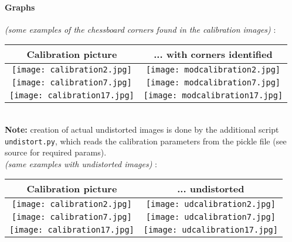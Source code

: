 \documentclass[a4paper]{article}
\begin{document}
\paragraph{Graphs}
\textit{(some examples of the chessboard corners found in the calibration images)}
:\\
\begin{tabular}{ |c|c| }
  \hline
  Calibration picture & ... with corners identified \\
  \hline
  \texttt{[image: calibration2.jpg]} & \texttt{[image: modcalibration2.jpg]} \\
  \hline
  \texttt{[image: calibration7.jpg]} & \texttt{[image: modcalibration7.jpg]} \\
  \hline
  \texttt{[image: calibration17.jpg]} & \texttt{[image: modcalibration17.jpg]} \\
  \hline
\end{tabular}
\\
\textbf{Note:} creation of actual undistorted images is done by the additional script
\texttt{undistort.py}, which reads the calibration parameters from the pickle file
(see source for required params).
\\

\textit{(same examples with undistorted images)}
:\\
\begin{tabular}{ |c|c| }
  \hline
  Calibration picture & ... undistorted \\
  \hline
  \texttt{[image: calibration2.jpg]} & \texttt{[image: udcalibration2.jpg]} \\
  \hline
  \texttt{[image: calibration7.jpg]} & \texttt{[image: udcalibration7.jpg]} \\
  \hline
  \texttt{[image: calibration17.jpg]} & \texttt{[image: udcalibration17.jpg]} \\
  \hline
\end{tabular}
\end{document}
